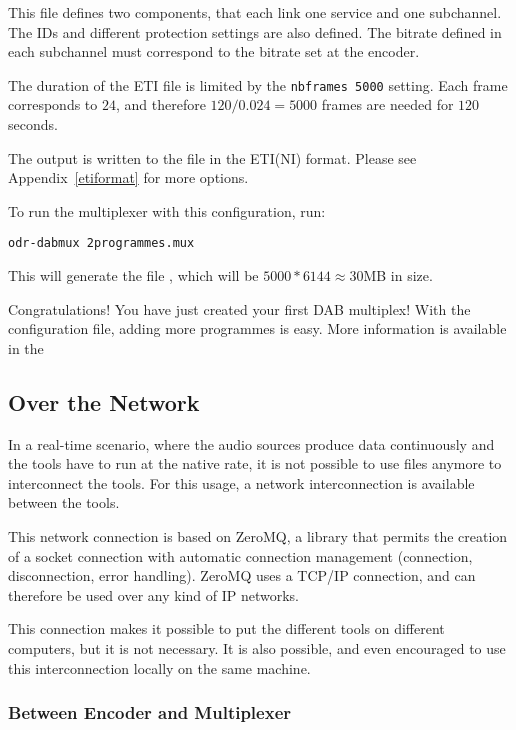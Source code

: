 This file defines two components, that each link one service and one
subchannel. The IDs and different protection settings are also defined.
The bitrate defined in each subchannel must correspond to the bitrate set at
the encoder.

The duration of the ETI file is limited by the \lstinline{nbframes 5000}
setting. Each frame corresponds to $24$\ms, and therefore $120 / 0.024 = 5000$
frames are needed for $120$ seconds.

The output is written to the file  in the ETI(NI) format.
Please see Appendix~\ref{etiformat} for more options.

To run the multiplexer with this configuration, run:
\begin{lstlisting}
odr-dabmux 2programmes.mux
\end{lstlisting}

This will generate the file , which will be $5000 * 6144
\approx 30$\si{MB} in size.

Congratulations! You have just created your first DAB multiplex! With the
configuration file, adding more programmes is easy. More information is
available in the 

\subsection{Over the Network}
In a real-time scenario, where the audio sources produce data continuously and
the tools have to run at the native rate, it is not possible to use files
anymore to interconnect the tools. For this usage, a network interconnection is
available between the tools.

This network connection is based on ZeroMQ, a library that permits the creation
of a socket connection with automatic connection management (connection,
disconnection, error handling).  ZeroMQ uses a TCP/IP connection, and can
therefore be used over any kind of IP networks.

This connection makes it possible to put the different tools on different
computers, but it is not necessary. It is also possible, and even encouraged to
use this interconnection locally on the same machine.

\subsubsection{Between Encoder and Multiplexer}
\label{sec:between_encoder_and_multiplexer}

